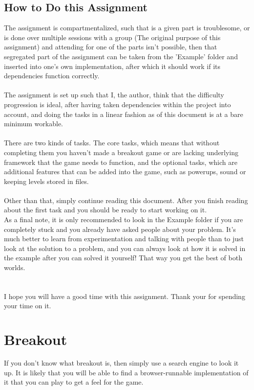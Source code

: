 \documentclass[12pt]{article}
\begin{document}
\subsection{How to Do this Assignment}
The assignment is compartmentalized, such that is a given part is troublesome, or is done over multiple sessions with a group (The original purpose of this assignment) and attending for one of the parts isn't possible, then that segregated part of the assignment can be taken from the 'Example' folder and inserted into one's own implementation, after which it should work if its dependencies function correctly.\\
\\
The assignment is set up such that I, the author, think that the difficulty progression is ideal, after having taken dependencies within the project into account, and doing the tasks in a linear fashion as of this document is at a bare minimum workable.\\
\\
There are two kinds of tasks. The core tasks, which means that without completing them you haven't made a breakout game or are lacking underlying framework that the game needs to function, and the optional tasks, which are additional features that can be added into the game, such as powerups, sound or keeping levels stored in files.\\
\\
Other than that, simply continue reading this document. After you finish reading about the first task and you should be ready to start working on it.\\
As a final note, it is only recommended to look in the Example folder if you are completely stuck and you already have asked people about your problem. It's much better to learn from experimentation and talking with people than to just look at the solution to a problem, and you can always look at how it is solved in the example after you can solved it yourself! That way you get the best of both worlds.\\
\\
\\
I hope you will have a good time with this assignment. Thank your for spending your time on it.

\section{Breakout}
If you don't know what breakout is, then simply use a search engine to look it up. It is likely that you will be able to find a browser-runnable implementation of it that you can play to get a feel for the game.
\end{document}

